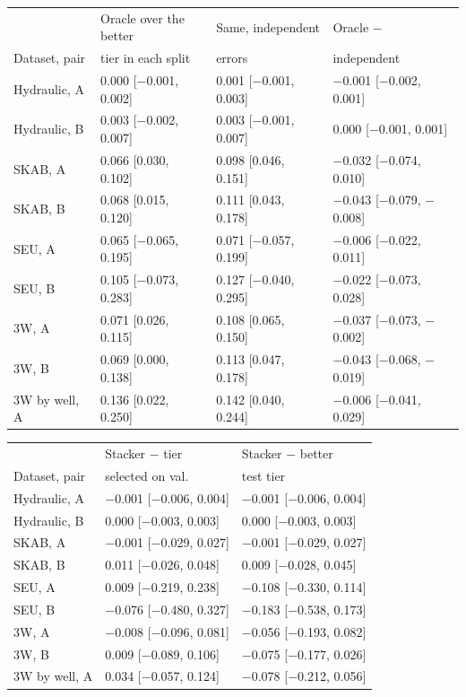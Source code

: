 \begin{tabular}{@{}l lll@{}}
\toprule
& Oracle over the better & Same, independent & Oracle $-$ \\
Dataset, pair & tier in each split & errors & independent \\
\midrule
Hydraulic, A & 0.000 [$-$0.001, 0.002] & 0.001 [$-$0.001, 0.003] & $-$0.001 [$-$0.002, 0.001] \\
Hydraulic, B & 0.003 [$-$0.002, 0.007] & 0.003 [$-$0.001, 0.007] & 0.000 [$-$0.001, 0.001] \\
SKAB, A & 0.066 [0.030, 0.102] & 0.098 [0.046, 0.151] & $-$0.032 [$-$0.074, 0.010] \\
SKAB, B & 0.068 [0.015, 0.120] & 0.111 [0.043, 0.178] & $-$0.043 [$-$0.079, $-$0.008] \\
SEU, A & 0.065 [$-$0.065, 0.195] & 0.071 [$-$0.057, 0.199] & $-$0.006 [$-$0.022, 0.011] \\
SEU, B & 0.105 [$-$0.073, 0.283] & 0.127 [$-$0.040, 0.295] & $-$0.022 [$-$0.073, 0.028] \\
3W, A & 0.071 [0.026, 0.115] & 0.108 [0.065, 0.150] & $-$0.037 [$-$0.073, $-$0.002] \\
3W, B & 0.069 [0.000, 0.138] & 0.113 [0.047, 0.178] & $-$0.043 [$-$0.068, $-$0.019] \\
3W by well, A & 0.136 [0.022, 0.250] & 0.142 [0.040, 0.244] & $-$0.006 [$-$0.041, 0.029] \\
\bottomrule
\end{tabular}
\par\medskip
\begin{tabular}{@{}l ll@{}}
\toprule
& Stacker $-$ tier & Stacker $-$ better \\
Dataset, pair & selected on val. & test tier \\
\midrule
Hydraulic, A & $-$0.001 [$-$0.006, 0.004] & $-$0.001 [$-$0.006, 0.004] \\
Hydraulic, B & 0.000 [$-$0.003, 0.003] & 0.000 [$-$0.003, 0.003] \\
SKAB, A & $-$0.001 [$-$0.029, 0.027] & $-$0.001 [$-$0.029, 0.027] \\
SKAB, B & 0.011 [$-$0.026, 0.048] & 0.009 [$-$0.028, 0.045] \\
SEU, A & 0.009 [$-$0.219, 0.238] & $-$0.108 [$-$0.330, 0.114] \\
SEU, B & $-$0.076 [$-$0.480, 0.327] & $-$0.183 [$-$0.538, 0.173] \\
3W, A & $-$0.008 [$-$0.096, 0.081] & $-$0.056 [$-$0.193, 0.082] \\
3W, B & 0.009 [$-$0.089, 0.106] & $-$0.075 [$-$0.177, 0.026] \\
3W by well, A & 0.034 [$-$0.057, 0.124] & $-$0.078 [$-$0.212, 0.056] \\
\bottomrule
\end{tabular}
